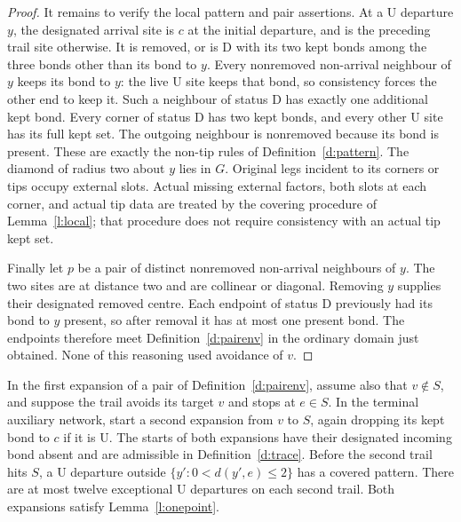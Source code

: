 \begin{proof}
It remains to verify the local pattern and pair assertions.  At a
\(\mathrm U\) departure \(y\), the designated arrival site is
\(c\) at the initial departure, and is the preceding trail site
otherwise.  It is removed, or is \(\mathrm D\) with its two kept
bonds among the three bonds other than its bond to \(y\).
Every nonremoved non-arrival neighbour of \(y\) keeps its bond to
\(y\): the live \(\mathrm U\) site keeps that bond, so consistency
forces the other end to keep it.  Such a neighbour of status
\(\mathrm D\) has exactly one additional kept bond.  Every corner
of status \(\mathrm D\) has two kept bonds, and every other
\(\mathrm U\) site has its full kept set.  The outgoing neighbour
is nonremoved because its bond is present.  These are exactly the
non-tip rules of Definition~\ref{d:pattern}.  The diamond of radius
two about \(y\) lies in \(G\).  Original legs incident to its
corners or tips occupy external slots.  Actual missing external
factors, both slots at each corner, and actual tip data are treated
by the covering procedure of Lemma~\ref{l:local}; that procedure
does not require consistency with an actual tip kept set.

Finally let \(p\) be a pair of distinct nonremoved non-arrival
neighbours of \(y\).  The two sites are at distance two and are
collinear or diagonal.  Removing \(y\) supplies their designated
removed centre.  Each endpoint of status \(\mathrm D\) previously
had its bond to \(y\) present, so after removal it has at most one
present bond.  The endpoints therefore meet
Definition~\ref{d:pairenv} in the ordinary domain just obtained.
None of this reasoning used avoidance of \(v\).
\end{proof}

\begin{lemma}\label{l:terminalcover}
In the first expansion of a pair of Definition~\ref{d:pairenv},
assume also that \(v\notin S\), and
suppose the trail avoids its target \(v\) and stops at \(e\in S\).
In the terminal auxiliary network, start a second expansion from \(v\)
to \(S\), again dropping its kept bond to \(c\) if it is \(\mathrm U\).
The starts of both expansions have their designated incoming bond
absent and are admissible in Definition~\ref{d:trace}.
Before the second trail hits \(S\), a \(\mathrm U\) departure
outside \(\{y':0<d(y',e)\le2\}\) has a covered pattern.
There are at most twelve exceptional \(\mathrm U\) departures
on each second trail. Both expansions satisfy Lemma~\ref{l:onepoint}.
\end{lemma}


